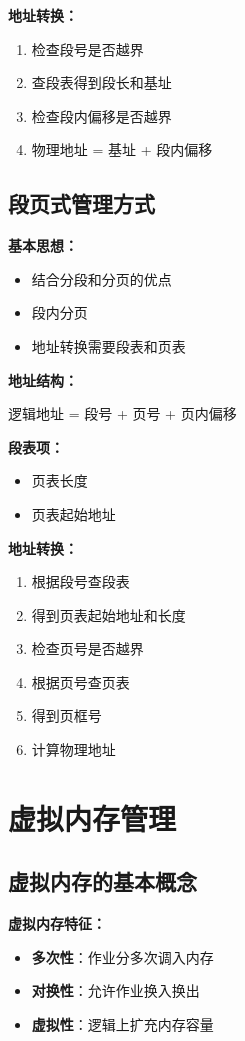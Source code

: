 \documentclass[lang=cn,newtx,10pt,scheme=chinese]{../../elegantbook}
\begin{document}
\textbf{地址转换：}
\begin{enumerate}
  \item 检查段号是否越界
  \item 查段表得到段长和基址
  \item 检查段内偏移是否越界
  \item 物理地址 = 基址 + 段内偏移
\end{enumerate}

\subsection{段页式管理方式}

\textbf{基本思想：}
\begin{itemize}
  \item 结合分段和分页的优点
  \item 段内分页
  \item 地址转换需要段表和页表
\end{itemize}

\textbf{地址结构：}
\begin{center}
逻辑地址 = 段号 + 页号 + 页内偏移
\end{center}

\textbf{段表项：}
\begin{itemize}
  \item 页表长度
  \item 页表起始地址
\end{itemize}

\textbf{地址转换：}
\begin{enumerate}
  \item 根据段号查段表
  \item 得到页表起始地址和长度
  \item 检查页号是否越界
  \item 根据页号查页表
  \item 得到页框号
  \item 计算物理地址
\end{enumerate}

\section{虚拟内存管理}

\subsection{虚拟内存的基本概念}

\textbf{虚拟内存特征：}
\begin{itemize}
  \item \textbf{多次性}：作业分多次调入内存
  \item \textbf{对换性}：允许作业换入换出
  \item \textbf{虚拟性}：逻辑上扩充内存容量
\end{itemize}
\end{document}

